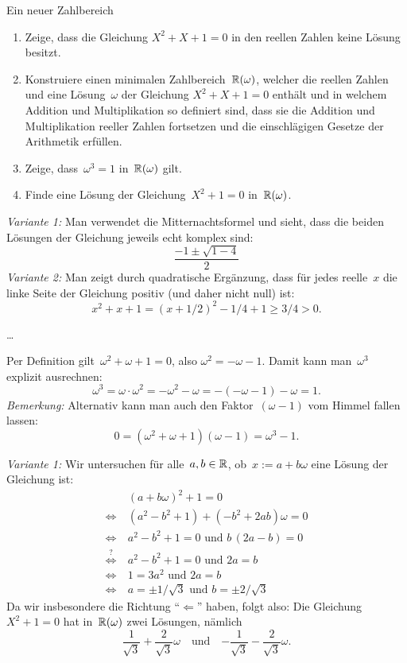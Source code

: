 \documentclass{algblatt}
\begin{document}
\begin{aufgabe}{Ein neuer Zahlbereich}
\begin{enumerate}
\item
Zeige, dass die Gleichung $X^2 + X + 1 = 0$ in den reellen Zahlen
keine Lösung besitzt.
\item
Konstruiere einen minimalen Zahlbereich~$\mathbb{R}(\omega)$, welcher die
reellen Zahlen und eine Lösung~$\omega$ der Gleichung $X^2 + X + 1 = 0$
enthält und in welchem Addition und Multiplikation so definiert sind, dass sie
die Addition und Multiplikation reeller Zahlen fortsetzen und die
einschlägigen Gesetze der Arithmetik erfüllen.
\item Zeige, dass~$\omega^3 = 1$ in~$\mathbb{R}(\omega)$ gilt.
\item Finde eine Lösung der Gleichung~$X^2 + 1 = 0$ in~$\mathbb{R}(\omega)$.
\end{enumerate}
\begin{loesungE}
\item \emph{Variante 1:} Man verwendet die Mitternachtsformel und sieht, dass
die beiden Lösungen der Gleichung jeweils echt komplex sind:
\[ \frac{-1 \pm \sqrt{1 - 4}}{2} \]
\emph{Variante 2:} Man zeigt durch quadratische Ergänzung, dass für jedes
reelle~$x$ die linke Seite der Gleichung positiv (und daher nicht null) ist:
\[ x^2 + x + 1 = (x + 1/2)^2 - 1/4 + 1 \geq 3/4 > 0. \]
\item \ldots
\item Per Definition gilt~$\omega^2 + \omega + 1 = 0$, also $\omega^2 = -\omega
- 1$. Damit kann man~$\omega^3$ explizit ausrechnen:
\[ \omega^3 = \omega \cdot \omega^2 = -\omega^2 - \omega = -(-\omega - 1) -
\omega = 1. \]
\emph{Bemerkung:} Alternativ kann man auch den Faktor~$(\omega-1)$ vom Himmel
fallen lassen:
\[ 0 = (\omega^2 + \omega + 1) (\omega - 1) = \omega^3 - 1. \]

\item \emph{Variante 1:} Wir untersuchen für alle~$a,b \in \mathbb{R}$, ob~$x := a + b
\omega$ eine Lösung der Gleichung ist:
\begin{align*}
  & (a + b\omega)^2 + 1 = 0 \\
  \Longleftrightarrow\ &
  (a^2 - b^2 + 1) + (-b^2 + 2ab) \omega = 0 \\
  \Longleftrightarrow\ &
  a^2 - b^2 + 1 = 0 \text{ und } b \, (2a-b) = 0 \\
  \stackrel{?}{\Longleftrightarrow}\ &
  a^2 - b^2 + 1 = 0 \text{ und } 2a = b \\
  \Longleftrightarrow\ &
  1 = 3 a^2 \text{ und } 2a = b \\
  \Longleftrightarrow\ &
  a = \pm 1 / \sqrt{3} \text{ und } b = \pm 2 / \sqrt{3}
\end{align*}
Da wir insbesondere die Richtung "`$\Leftarrow$"' haben, folgt also: Die
Gleichung~$X^2 + 1 = 0$ hat in~$\mathbb{R}(\omega)$ zwei Lösungen, nämlich
\[ \frac{1}{\sqrt{3}} + \frac{2}{\sqrt{3}} \omega \quad\text{und}\quad
  {-\frac{1}{\sqrt{3}} - \frac{2}{\sqrt{3}} \omega}. \]


\end{loesungE}
\end{aufgabe}
\end{document}
